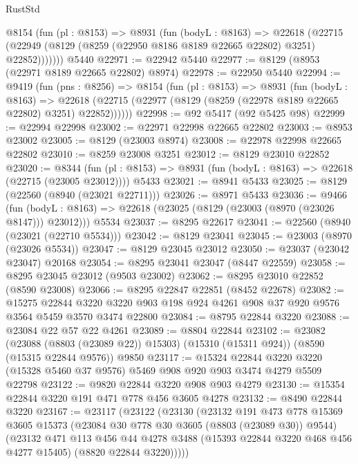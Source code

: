 \begin{lexlean}{RustStd}
\begin{coremodule}
      @8154
        (fun (pl : @8153) =>
        @8931
          (fun (bodyL : @8163) =>
          @22618
            (@22715 (@22949 (@8129 (@8259 (@22950 @8186 @8189 @22665 @22802) @3251) @22852)))))))
    @5440
@22971 := @22942 @5440
@22977 := @8129 (@8953 (@22971 @8189 @22665 @22802) @8974)
@22978 := @22950 @5440
@22994 := @9419
    (fun (pns : @8256) =>
    @8154
      (fun (pl : @8153) =>
      @8931
        (fun (bodyL : @8163) =>
        @22618 (@22715 (@22977 (@8129 (@8259 (@22978 @8189 @22665 @22802) @3251) @22852))))))
@22998 := @92 @5417 (@92 @5425 @98)
@22999 := @22994 @22998
@23002 := @22971 @22998 @22665 @22802
@23003 := @8953 @23002
@23005 := @8129 (@23003 @8974)
@23008 := @22978 @22998 @22665 @22802
@23010 := @8259 @23008 @3251
@23012 := @8129 @23010 @22852
@23020 := @8344
    (fun (pl : @8153) => @8931 (fun (bodyL : @8163) => @22618 (@22715 (@23005 @23012))))
    @5433
@23021 := @8941 @5433
@23025 := @8129 (@22560 (@8940 (@23021 @22711)))
@23026 := @8971 @5433
@23036 := @9466
    (fun (bodyL : @8163) => @22618 (@23025 (@8129 (@23003 (@8970 (@23026 @8147))) @23012)))
    @5534
@23037 := @8295 @22617
@23041 := @22560 (@8940 (@23021 (@22710 @5534)))
@23042 := @8129 @23041
@23045 := @23003 (@8970 (@23026 @5534))
@23047 := @8129 @23045 @23012
@23050 := @23037 (@23042 @23047) @20168
@23054 := @8295 @23041 @23047 (@8447 @22559)
@23058 := @8295 @23045 @23012 (@9503 @23002)
@23062 := @8295 @23010 @22852 (@8590 @23008)
@23066 := @8295 @22847 @22851 (@8452 @22678)
@23082 := @15275
    @22844
    @3220
    @3220
    @903
    @198
    @924
    @4261
    @908
    @37
    @920
    @9576
    @3564
    @5459
    @3570
    @3474
    @22800
@23084 := @8795 @22844 @3220
@23088 := @23084 @22 @57 @22 @4261
@23089 := @8804 @22844
@23102 := @23082
    (@23088 (@8803 (@23089 @22)) @15303)
    (@15310 (@15311 @924))
    (@8590 (@15315 @22844 @9576))
    @9850
@23117 := @15324
    @22844
    @3220
    @3220
    (@15328 @5460 @37 @9576)
    @5469
    @908
    @920
    @903
    @3474
    @4279
    @5509
    @22798
@23122 := @9820 @22844 @3220 @908 @903 @4279
@23130 := @15354 @22844 @3220 @191 @471 @778 @456 @3605 @4278
@23132 := @8490 @22844 @3220
@23167 := @23117
    (@23122
      (@23130
        (@23132
          @191
          @473
          @778
          @15369
          @3605
          @15373
          (@23084 @30 @778 @30 @3605 (@8803 (@23089 @30)) @9544)
          (@23132
            @471
            @113
            @456
            @44
            @4278
            @3488
            (@15393 @22844 @3220 @468 @456 @4277 @15405)
            (@8820 @22844 @3220)))))

\end{coremodule}
\end{lexlean}
